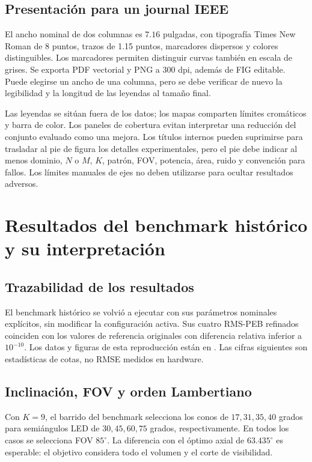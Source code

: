 \documentclass[11pt,a4paper]{article}
\begin{document}
\subsection{Presentación para un journal IEEE}
El ancho nominal de dos columnas es $7.16$ pulgadas, con tipografía Times New Roman de 8 puntos, trazos de 1.15 puntos, marcadores dispersos y colores distinguibles. Los marcadores permiten distinguir curvas también en escala de grises. Se exporta PDF vectorial y PNG a 300 dpi, además de FIG editable. Puede elegirse un ancho de una columna, pero se debe verificar de nuevo la legibilidad y la longitud de las leyendas al tamaño final.

Las leyendas se sitúan fuera de los datos; los mapas comparten límites cromáticos y barra de color. Los paneles de cobertura evitan interpretar una reducción del conjunto evaluado como una mejora. Los títulos internos pueden suprimirse para trasladar al pie de figura los detalles experimentales, pero el pie debe indicar al menos dominio, $N$ o $M$, $K$, patrón, FOV, potencia, área, ruido y convención para fallos. Los límites manuales de ejes no deben utilizarse para ocultar resultados adversos.

\section{Resultados del benchmark histórico y su interpretación}
\subsection{Trazabilidad de los resultados}
El benchmark histórico se volvió a ejecutar con sus parámetros nominales explícitos, sin modificar la configuración activa. Sus cuatro RMS-PEB refinados coinciden con los valores de referencia originales con diferencia relativa inferior a $10^{-10}$. Los datos y figuras de esta reproducción están en . Las cifras siguientes son estadísticas de cotas, no RMSE medidos en hardware.

\subsection{Inclinación, FOV y orden Lambertiano}
Con $K=9$, el barrido del benchmark selecciona los conos de $17,31,35,40$ grados para semiángulos LED de $30,45,60,75$ grados, respectivamente. En todos los casos se selecciona FOV $85^\circ$. La diferencia con el óptimo axial de $63.435^\circ$ es esperable: el objetivo considera todo el volumen y el corte de visibilidad.
\end{document}
